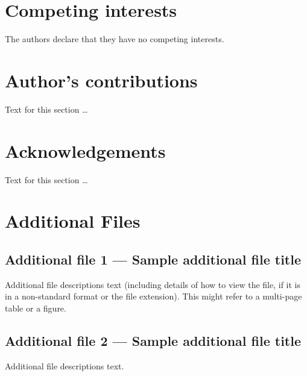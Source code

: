 \documentclass{configs/bmcart}
\begin{document}
\begin{backmatter}


\section*{Competing interests}
  The authors declare that they have no competing interests.

\section*{Author's contributions}
    Text for this section \ldots

\section*{Acknowledgements}
  Text for this section \ldots


\section*{Additional Files}
  \subsection*{Additional file 1 --- Sample additional file title}
    Additional file descriptions text (including details of how to
    view the file, if it is in a non-standard format or the file extension).  This might
    refer to a multi-page table or a figure.

  \subsection*{Additional file 2 --- Sample additional file title}
    Additional file descriptions text.



\end{backmatter}
\end{document}
